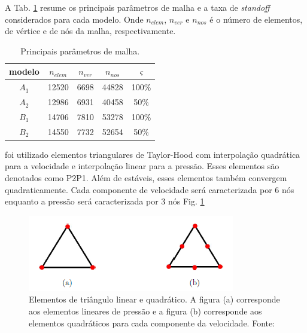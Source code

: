 \noindent A Tab. \ref{tab:Geo_Valor_Standoff} resume os principais parâmetros de malha e a taxa de \textit{standoff} considerados para cada modelo. Onde $n_{elem}$, $n_{ver}$ e $n_{nos}$ é o número de elementos, de vértice e de nós da malha, respectivamente.
\begin{table}[h!]
    \centering
    \caption{Principais parâmetros de malha.}
    \begin{tabular}{ccccc}
    \hline
    modelo & $n_{elem}$ & $n_{ver}$ & $n_{nos}$ & $\varsigma$ \\
    \hline
    $A_1$ & 12520 & 6698 & 44828 & 100\% \\
    $A_2$ & 12986 & 6931 & 40458 & 50\% \\
    $B_1$ & 14706 & 7810 & 53278 & 100\% \\
    $B_2$ & 14550 & 7732 & 52654 & 50\% \\
    \hline
    \end{tabular}
    \label{tab:Geo_Valor_Standoff}
\end{table}

foi utilizado elementos triangulares de Taylor-Hood \cite{Taylor} com interpolação quadrática para a velocidade e interpolação linear para a pressão. Esses elementos são denotados como P2P1. Além de estáveis, esses elementos também convergem quadraticamente. Cada componente de velocidade será caracterizada por 6 nós enquanto a pressão será caracterizada por 3 nós Fig. \ref{fig:elements}

\begin{figure}[H]
	\centering
	\includegraphics[scale=1]{img/elements.png}
	\caption[Representação dos contornos da malha.]{Elementos de triângulo linear e quadrático. A figura (a) corresponde aos elementos lineares de pressão e a figura (b) corresponde aos elementos quadráticos para cada componente da velocidade. Fonte: \cite{Cornthwaite}}
	\label{fig:elements}
\end{figure}